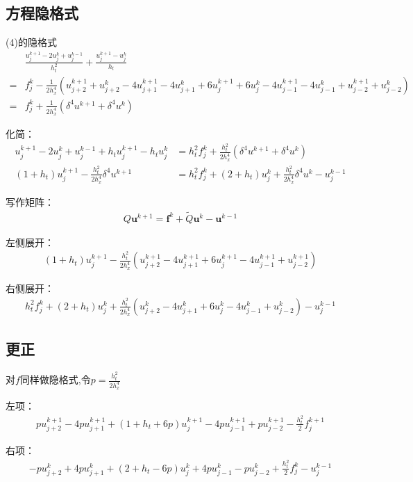 \documentclass[UTF8]{ctexbook}
\begin{document}
\subsection{方程隐格式}
(4)的隐格式
\begin{align}
    &\frac{u^{k+1}_j-2u^k_j+u^{k-1}_j}{h^2_t}+\frac{u^{k+1}_j-u^k_j}{h_t}\\
    =&f_j^k-\frac{1}{2h^4_x}\left(
        u^{k+1}_{j+2}+u^{k}_{j+2}
        -4u^{k+1}_{j+1}-4u^{k}_{j+1}
        + 6u^{k+1}_j+ 6u^{k}_j 
        - 4u^{k+1}_{j-1} - 4u^{k}_{j-1}
        + u^{k+1}_{j-2}+ u^{k}_{j-2}
        \right)\\
    =&f_j^k+\frac{1}{2h^4_x}\left(\delta^4 u^{k+1}+\delta^4 u^k\right)
\end{align}

化简：
\begin{align}
    u^{k+1}_j-2u^k_j+u^{k-1}_j+h_t u^{k+1}_j-h_t u^k_j &=h^2_t f^k_j+ \frac{h_t^2}{2h^4_x}(\delta^4 u^{k+1}+\delta^4 u^k)\\
    (1+h_t)u^{k+1}_j-\frac{h^2_t}{2h^4_x}\delta^4 u^{k+1}&=
    h^2_t f^k_j+(2+h_t)u^{k}_j+\frac{h^2_t}{2h^4_x}\delta^4 u^{k}-u^{k-1}_j
\end{align}

写作矩阵：
\begin{align}
    Q\mathbf{u}^{k+1}=\mathbf{f}^k+\tilde{Q}\mathbf{u}^k-\mathbf{u}^{k-1}
\end{align}

左侧展开：
\begin{align}
    (1+h_t)u^{k+1}_j -\frac{h_t^2}{2h^4_x}(
        u^{k+1}_{j+2}
    -4u^{k+1}_{j+1}
    + 6u^{k+1}_j
    - 4u^{k+1}_{j-1}
    + u^{k+1}_{j-2})
\end{align}

右侧展开：
\begin{align}
    h^2_t f^k_j+(2+h_t)u^{k}_j+\frac{h^2_t}{2h^4_x}(        
    u^{k}_{j+2}
    -4u^{k}_{j+1}
    + 6u^{k}_j
    - 4u^{k}_{j-1}
    + u^{k}_{j-2})-u^{k-1}_j
\end{align}

\subsection{更正}
对$f$同样做隐格式,令$p = \frac{h_t^2}{2h^4_x}$

左项：
\begin{align}
    pu^{k+1}_{j+2}-4pu^{k+1}_{j+1}
    +(1+h_t+6p)u^{k+1}_j-4pu^{k+1}_{j-1}+pu^{k+1}_{j-2}
    -\frac{h_t^2}{2}f^{k+1}_j
\end{align}

右项：
\begin{align}
    -pu^{k}_{j+2}+4pu^{k}_{j+1}
    +(2+h_t-6p)u^{k}_j+4pu^{k}_{j-1}-pu^{k}_{j-2}
    +\frac{h_t^2}{2}f^{k}_j-u^{k-1}_j
\end{align}
\end{document}
